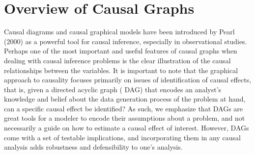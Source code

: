 \section{Overview of Causal Graphs}

Causal diagrams and causal graphical models have been introduced by Pearl 
(2000) as a powerful tool for causal inference, especially in observational 
studies. Perhaps one of the most important and useful features of causal 
graphs when dealing with causal inference problems is the clear illustration 
of the causal relationships between the variables. It is important to note 
that the graphical approach to causality focuses primarily on issues of 
identification of causal effects, that is, given a directed acyclic graph (
DAG) that encodes an analyst's knowledge and belief about the data 
generation process of the problem at hand, can a specific causal effect be 
identified? As such, we emphasize that DAGs are great tools for a modeler to 
encode their assumptions about a problem, and not necessarily a guide on how 
to estimate a causal effect of interest. However, DAGs come with a set of 
testable implications, and incorporating them in any causal analysis adds robustness and defensibility to one's analysis. 




\blindtext[2]